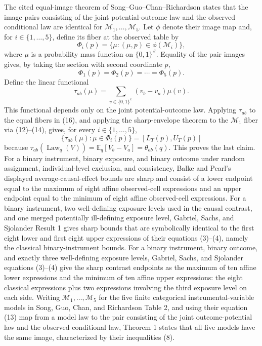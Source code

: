 The cited equal-image theorem of Song--Guo--Chan--Richardson states that the image pairs consisting of the joint potential-outcome law and the observed conditional law are identical for \(\mathcal M_1,\ldots,\mathcal M_5\).  Let \(\phi\) denote their image map and, for \(i\in\{1,\ldots,5\}\), define its fiber at the observed table by
\[
 \Phi_i(p)=\{\mu:(\mu,p)\in\phi(\mathcal M_i)\},
 \tag{15}
\]
where \(\mu\) is a probability mass function on \(\{0,1\}^{\mathcal E}\).  Equality of the pair images gives, by taking the section with second coordinate \(p\),
\[
 \Phi_1(p)=\Phi_2(p)=\cdots=\Phi_5(p).
 \tag{16}
\]
Define the linear functional
\[
 \tau_{ab}(\mu)=\sum_{v\in\{0,1\}^{\mathcal E}}(v_b-v_a)\mu(v).
 \tag{17}
\]
This functional depends only on the joint potential-outcome law.  Applying \(\tau_{ab}\) to the equal fibers in (16), and applying the sharp-envelope theorem to the \(\mathcal M_1\) fiber via (12)--(14), gives, for every \(i\in\{1,\ldots,5\}\),
\[
 \{\tau_{ab}(\mu):\mu\in\Phi_i(p)\}
 =[L_T(p),U_T(p)]
 \tag{18}
\]
because \(\tau_{ab}(\operatorname{Law}_q(V))=\mathbb E_q[V_b-V_a]=\theta_{ab}(q)\).  This proves the last claim.
For a binary instrument, binary exposure, and binary outcome under random assignment, individual-level exclusion, and consistency, Balke and Pearl's displayed average-causal-effect bounds are sharp and consist of a lower endpoint equal to the maximum of eight affine observed-cell expressions and an upper endpoint equal to the minimum of eight affine observed-cell expressions.
For a binary instrument, two well-defining exposure levels used in the causal contrast, and one merged potentially ill-defining exposure level, Gabriel, Sachs, and Sjolander Result 1 gives sharp bounds that are symbolically identical to the first eight lower and first eight upper expressions of their equations (3)--(4), namely the classical binary-instrument bounds.
For a binary instrument, binary outcome, and exactly three well-defining exposure levels, Gabriel, Sachs, and Sjolander equations (3)--(4) give the sharp contrast endpoints as the maximum of ten affine lower expressions and the minimum of ten affine upper expressions: the eight classical expressions plus two expressions involving the third exposure level on each side.
Writing \(\mathcal M_1,\ldots,\mathcal M_5\) for the five finite categorical instrumental-variable models in Song, Guo, Chan, and Richardson Table 2, and using their equation (13) map from a model law to the pair consisting of the joint outcome-potential law and the observed conditional law, Theorem 1 states that all five models have the same image, characterized by their inequalities (8).
